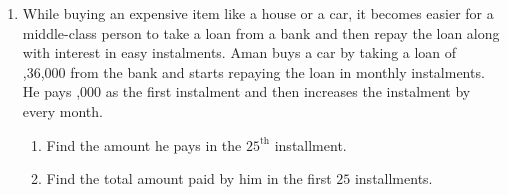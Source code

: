 \begin{enumerate}
        \item While buying an expensive item like a house or a car, it becomes easier for a middle-class person to take a loan from a bank and then repay the loan along with interest in easy instalments. 
          Aman buys a car by taking a loan of ,36,000 from the bank and starts repaying the loan in monthly instalments. He pays ,000 as the first instalment and then increases the instalment by  every month. 
        \begin{enumerate}
        \item Find the amount he pays in the $25^{\text{th}}$ installment.
\item Find the total amount paid by him in the first $25$ installments.
    \end{enumerate} 
       
        \end{enumerate}
